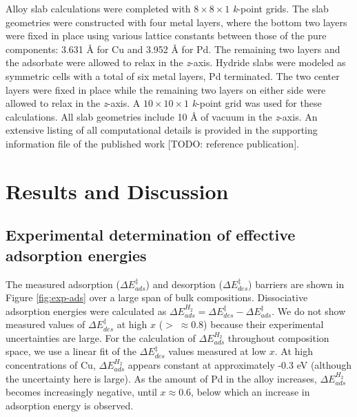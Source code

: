 \documentclass[12pt]{cmuthesis}
\begin{document}
Alloy slab calculations were completed with \(8 \times 8 \times 1\) \emph{k}-point grids. The slab geometries were constructed with four metal layers, where the bottom two layers were fixed in place using various lattice constants between those of the pure components: 3.631 \AA{} for Cu and 3.952 \AA{} for Pd. The remaining two layers and the adsorbate were allowed to relax in the \emph{z}-axis. Hydride slabs were modeled as symmetric cells with a total of six metal layers, Pd terminated. The two center layers were fixed in place while the remaining two layers on either side were allowed to relax in the \emph{z}-axis. A \(10 \times 10 \times 1\) \emph{k}-point grid was used for these calculations. All slab geometries include 10 \AA{} of vacuum in the \emph{z}-axis. An extensive listing of all computational details is provided in the supporting information file of the published work [TODO: reference publication].

\section{Results and Discussion}
\label{sec:orgaa8b54a}
\subsection{Experimental determination of effective adsorption energies}
\label{sec:org157ab78}
The measured adsorption (\(\Delta E^{\ddagger}_{ads}\)) and desorption (\(\Delta E^{\ddagger}_{des}\)) barriers are shown in Figure \ref{fig:exp-ads} over a large span of bulk compositions. Dissociative adsorption energies were calculated as \(\Delta E^{H_{2}}_{ads} = \Delta E^{\ddagger}_{des} - \Delta E^{\ddagger}_{ads}\). We do not show measured values of \(\Delta E^{\ddagger}_{des}\) at high \(x\) (\(> \; \approx 0.8\)) because their experimental uncertainties are large. For the calculation of \(\Delta E^{H_{2}}_{ads}\) throughout composition space, we use a linear fit of the \(\Delta E^{\ddagger}_{des}\) values measured at low \(x\). At high concentrations of Cu, \(\Delta E^{H_{2}}_{ads}\) appears constant at approximately -0.3 eV (although the uncertainty here is large). As the amount of Pd in the alloy increases, \(\Delta E^{H_{2}}_{ads}\) becomes increasingly negative, until \(x \approx 0.6\), below which an increase in adsorption energy is observed.
\end{document}
